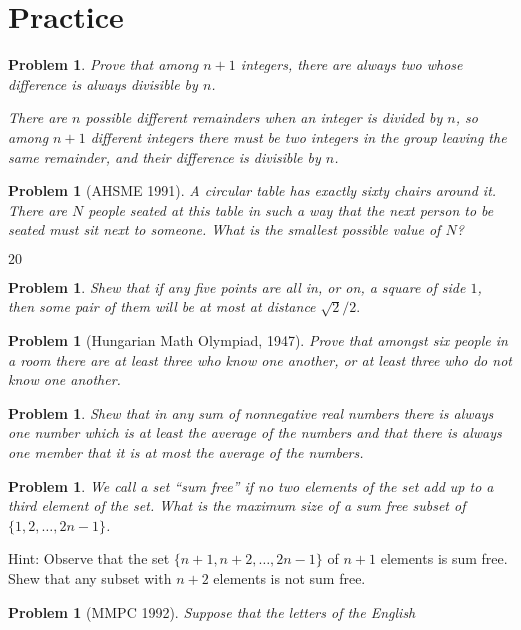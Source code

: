 \documentclass[11pt, openany]{book}
\theoremstyle{change} \theoremheaderfont{\blue\sffamily\bfseries}
\newtheorem{pro}[thm]{Problem}
\theoremstyle{nonumberplain} \theoremheaderfont{\sffamily\bfseries}
\newcommand{\í}{\'{\i}}
\begin{document}
\section*{Practice}\begin{multicols}{2}\columnseprule 1pt \columnsep 25pt
\begin{pro}
Prove that among $n+1$ integers, there are always two whose
difference is always divisible by $n$.
\begin{answer}
There are $n$ possible different remainders when an integer is
divided by $n$, so among $n+1$ different integers there must be two
integers in the group leaving the same remainder,  and their
difference is divisible by $n$.
\end{answer}
\end{pro}
\begin{pro}[AHSME 1991] A circular table has exactly sixty chairs
around it. There are $N$ people seated at this table in such a way
that the next person to be seated must sit next to someone. What
is the smallest possible value of $N$?
\begin{answer}$20$
\end{answer}
\end{pro}
\begin{pro} Shew that if any five points are all in, or on, a square
of side $1$, then some pair of them will be at most at distance
$\sqrt{2}/2.$\end{pro} \begin{pro}[Hungarian Math Olympiad, 1947]
Prove that amongst six people in a room there are at least three
who know one another, or at least three who do not know one
another.\end{pro}
\begin{pro} Shew that in any sum of nonnegative real numbers there is always
one number which is at least the average of the numbers and that
there is always one member that it is at most the average of the
numbers.\end{pro}
\begin{pro} We call a set ``sum free'' if no two elements of the set add up
to a third element of the set. What is the maximum size of a sum
free subset of $\{ 1, 2, \ldots , 2n - 1\}$.\end{pro}Hint: Observe
that the set $\{ n + 1, n + 2, \ldots , 2n - 1\}$ of $n + 1$
elements is sum free. Shew that any subset with $n + 2$ elements
is not sum free.
\begin{pro}[MMPC 1992] Suppose that the letters of the English

\end{pro}
\end{multicols}
\end{document}
